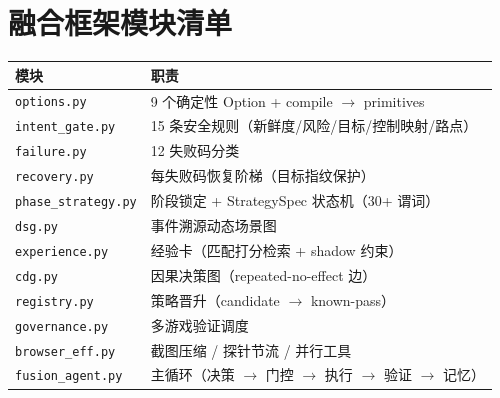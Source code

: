 \documentclass[11pt,a4paper]{article}
\begin{document}
\section{融合框架模块清单}
\begin{longtable}{ll}
\toprule
模块 & 职责 \\
\midrule
\texttt{options.py} & 9 个确定性 Option + compile $\rightarrow$ primitives \\
\texttt{intent\_gate.py} & 15 条安全规则（新鲜度/风险/目标/控制映射/路点） \\
\texttt{failure.py} & 12 失败码分类 \\
\texttt{recovery.py} & 每失败码恢复阶梯（目标指纹保护） \\
\texttt{phase\_strategy.py} & 阶段锁定 + StrategySpec 状态机（30+ 谓词） \\
\texttt{dsg.py} & 事件溯源动态场景图 \\
\texttt{experience.py} & 经验卡（匹配打分检索 + shadow 约束） \\
\texttt{cdg.py} & 因果决策图（repeated-no-effect 边） \\
\texttt{registry.py} & 策略晋升（candidate $\rightarrow$ known-pass） \\
\texttt{governance.py} & 多游戏验证调度 \\
\texttt{browser\_eff.py} & 截图压缩 / 探针节流 / 并行工具 \\
\texttt{fusion\_agent.py} & 主循环（决策 $\rightarrow$ 门控 $\rightarrow$ 执行 $\rightarrow$ 验证 $\rightarrow$ 记忆） \\
\bottomrule
\end{longtable}
\end{document}
